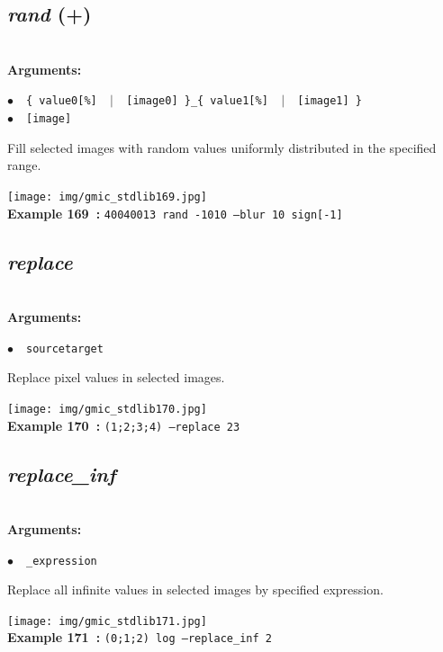 \documentclass[a4paper,10.5pt,twoside]{book}
\def\comma{\discretionary{,}{}{,}}
\newcommand{\Cb}[1]{\textcolor{cb}{#1}}
\begin{document}
\subsection{\emph{rand} (+)}\vspace*{-0.7em}
~\\\textbf{\Cb{Arguments: }}\begin{flushleft}
{\small \Cb{\hspace*{0.5cm}$\bullet$~~\texttt{\{ value0[\%] ~$|$~ [image0] \}{\comma}\_\{ value1[\%] ~$|$~ [image1] \}}}}~~~\\
{\small \Cb{\hspace*{0.5cm}$\bullet$~~\texttt{[image]}}}\end{flushleft}
Fill selected images with random values uniformly distributed in the specified range.
\begin{center}\texttt{[image: img/gmic\_stdlib169.jpg]}\\
{\footnotesize \textbf{Example 169~:} \texttt{400{\comma}400{\comma}1{\comma}3 rand -10{\comma}10 --blur 10 sign[-1]}}
\end{center}

\subsection{\emph{replace} }\vspace*{-0.7em}
~\\\textbf{\Cb{Arguments: }}\begin{flushleft}
{\small \Cb{\hspace*{0.5cm}$\bullet$~~\texttt{source{\comma}target}}}\end{flushleft}
Replace pixel values in selected images.
\begin{center}\texttt{[image: img/gmic\_stdlib170.jpg]}\\
{\footnotesize \textbf{Example 170~:} \texttt{(1;2;3;4) --replace 2{\comma}3}}
\end{center}

\subsection{\emph{replace\_inf} }\vspace*{-0.7em}
~\\\textbf{\Cb{Arguments: }}\begin{flushleft}
{\small \Cb{\hspace*{0.5cm}$\bullet$~~\texttt{\_expression}}}\end{flushleft}
Replace all infinite values in selected images by specified expression.
\begin{center}\texttt{[image: img/gmic\_stdlib171.jpg]}\\
{\footnotesize \textbf{Example 171~:} \texttt{(0;1;2) log --replace\_inf 2}}
\end{center}
\end{document}
